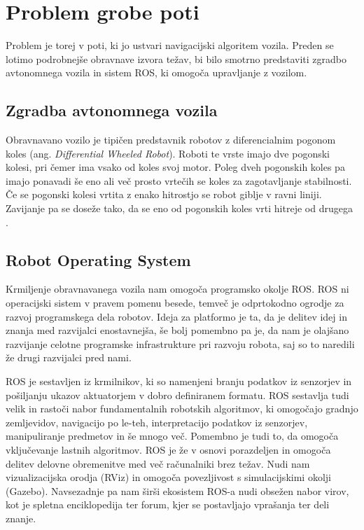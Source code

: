 \chapter{Problem grobe poti}\label{cha:teoreticne_osnove}

Problem je torej v poti, ki jo ustvari navigacijski algoritem vozila. Preden se lotimo podrobnejše obravnave izvora težav, bi bilo smotrno predstaviti zgradbo avtonomnega vozila in sistem ROS, ki omogoča upravljanje z vozilom.

\section{Zgradba avtonomnega vozila}

Obravnavano vozilo je tipičen predstavnik robotov z diferencialnim pogonom koles (ang. \textit{Differential Wheeled Robot}).
Roboti te vrste imajo dve pogonski kolesi, pri čemer ima vsako od koles svoj motor. Poleg dveh pogonskih koles pa imajo ponavadi še eno ali več prosto vrtečih se koles za zagotavljanje stabilnosti. Če se pogonski kolesi vrtita z enako hitrostjo se robot giblje v ravni liniji. Zavijanje pa se doseže tako, da se eno od pogonskih koles vrti hitreje od drugega \cite{vir1}. %

\section{Robot Operating System}
Krmiljenje obravnavanega vozila nam omogoča programsko okolje ROS. ROS ni operacijski sistem v pravem pomenu besede, temveč je odprtokodno ogrodje za razvoj programskega dela robotov. Ideja za platformo je ta, da je delitev idej in znanja med razvijalci enostavnejša, še bolj pomembno pa je, da nam je olajšano razvijanje celotne programske infrastrukture pri razvoju robota, saj so to naredili že drugi razvijalci pred nami.

ROS je sestavljen iz krmilnikov, ki so namenjeni branju podatkov iz senzorjev in pošiljanju ukazov aktuatorjem v dobro definiranem formatu. ROS sestavlja tudi velik in rastoči nabor fundamentalnih robotskih algoritmov, ki omogočajo gradnjo zemljevidov, navigacijo po le-teh, interpretacijo podatkov iz senzorjev, manipuliranje predmetov in še mnogo več. Pomembno je tudi to, da omogoča vključevanje lastnih algoritmov. ROS je že v osnovi porazdeljen in omogoča delitev delovne obremenitve med več računalniki brez težav. Nudi nam vizualizacijska orodja (RViz) in omogoča povezljivost s simulacijskimi okolji (Gazebo). Navsezadnje pa nam širši ekosistem ROS-a nudi obsežen nabor virov, kot je spletna enciklopedija ter forum, kjer se postavljajo vprašanja ter deli znanje.

